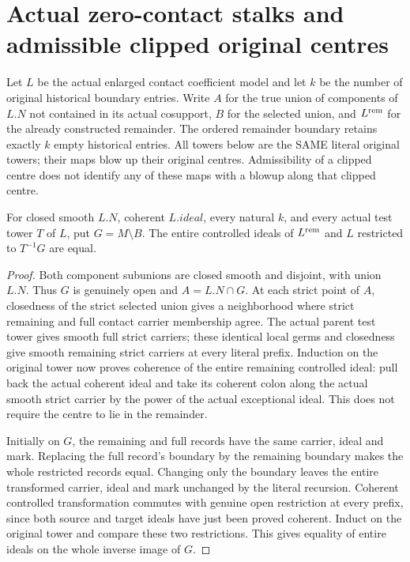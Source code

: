 \section{Actual zero-contact stalks and admissible clipped original centres}
Let $L$ be the actual enlarged contact coefficient model and let $k$ be the
number of original historical boundary entries. Write $A$ for the true union
of components of $L.N$ not contained in its actual cosupport, $B$ for the
selected union, and $L^{\rm rem}$ for the already constructed remainder.
The ordered remainder boundary retains exactly $k$ empty historical entries.
All towers below are the SAME literal original towers; their maps blow up
their original centres. Admissibility of a clipped centre does not identify
any of these maps with a blowup along that clipped centre.

\begin{theorem}
\label{hir:zero-contact-remainder-open-ideal-dictionary}
\leanok
{}
For closed smooth $L.N$, coherent $L.ideal$, every natural $k$, and every
actual test tower $T$ of $L$, put $G=M\setminus B$. The entire controlled
ideals of $L^{\rm rem}$ and $L$ restricted to $T^{-1}G$ are equal.
\end{theorem}
\begin{proof}
Both component subunions are closed smooth and disjoint, with union $L.N$.
Thus $G$ is genuinely open and $A=L.N\cap G$. At each strict point of $A$,
closedness of the strict selected union gives a neighborhood where strict
remaining and full contact carrier membership agree. The actual parent test
tower gives smooth full strict carriers; these identical local germs and
closedness give smooth remaining strict carriers at every literal prefix.
Induction on the original tower now proves coherence of the entire remaining
controlled ideal: pull back the actual coherent ideal and take its coherent
colon along the actual smooth strict carrier by the power of the actual
exceptional ideal. This does not require the centre to lie in the remainder.

Initially on $G$, the remaining and full records have the same carrier, ideal
and mark. Replacing the full record's boundary by the remaining boundary makes
the whole restricted records equal. Changing only the boundary leaves the
entire transformed carrier, ideal and mark unchanged by the literal recursion.
Coherent controlled transformation commutes with genuine open restriction
at every prefix, since both source and target ideals have just been proved
coherent. Induct on the original tower and compare these two restrictions.
This gives equality of entire ideals on the whole inverse image of $G$.
\end{proof}

